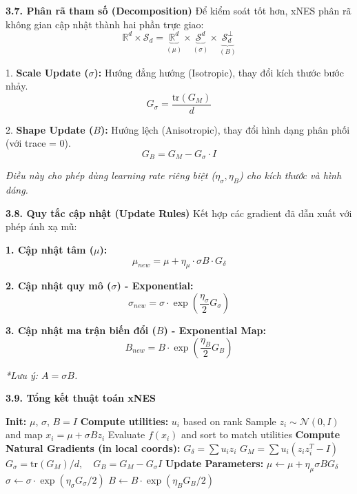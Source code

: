 \documentclass[10pt,xcolor=dvipsnames]{beamer}
\begin{document}
\begin{frame}{\textbf{3.7. Phân rã tham số (Decomposition)}}
	Để kiểm soát tốt hơn, xNES phân rã không gian cập nhật thành hai phần trực giao:
	\[ \mathbb{R}^d \times \mathcal{S}_d = \underbrace{\mathbb{R}^d}_{(\mu)} \times \underbrace{\mathcal{S}^d}_{(\sigma)} \times \underbrace{\mathcal{S}_d^\perp}_{(B)} \]
	
	1. \textbf{Scale Update ($\sigma$):} Hướng đẳng hướng (Isotropic), thay đổi kích thước bước nhảy.
	\[ G_\sigma = \frac{\text{tr}(G_M)}{d} \]
	
	2. \textbf{Shape Update ($B$):} Hướng lệch (Anisotropic), thay đổi hình dạng phân phối (với trace = 0).
	\[ G_B = G_M - G_\sigma \cdot I \]
	
	\textit{Điều này cho phép dùng learning rate riêng biệt ($\eta_\sigma, \eta_B$) cho kích thước và hình dáng.}
\end{frame}

\begin{frame}{\textbf{3.8. Quy tắc cập nhật (Update Rules)}}
	Kết hợp các gradient đã dẫn xuất với phép ánh xạ mũ:
	
	\textbf{1. Cập nhật tâm ($\mu$):}
	\[ \mu_{new} = \mu + \eta_\mu \cdot \sigma B \cdot G_\delta \]
	
	\textbf{2. Cập nhật quy mô ($\sigma$) - Exponential:}
	\[ \sigma_{new} = \sigma \cdot \exp\left( \frac{\eta_\sigma}{2} G_\sigma \right) \]
	
	\textbf{3. Cập nhật ma trận biến đổi ($B$) - Exponential Map:}
	\[ B_{new} = B \cdot \exp\left( \frac{\eta_B}{2} G_B \right) \]
	
	\footnotesize \textit{*Lưu ý: $A = \sigma B$.}
\end{frame}

\begin{frame}{\textbf{3.9. Tổng kết thuật toán xNES}}
	\begin{algorithm}[H]
		\small
		\begin{algorithmic}[1]
			\STATE \textbf{Init:} $\mu$, $\sigma$, $B=I$
			\STATE \textbf{Compute utilities:} $u_i$ based on rank
			\LOOP
			\STATE Sample $z_i \sim \mathcal{N}(0, I)$ and map $x_i = \mu + \sigma B z_i$
			\STATE Evaluate $f(x_i)$ and sort to match utilities
			\STATE \textbf{Compute Natural Gradients (in local coords):}
			\STATE \quad $G_\delta = \sum u_i z_i$
			\STATE \quad $G_M = \sum u_i (z_i z_i^T - I)$
			\STATE \quad $G_\sigma = \text{tr}(G_M)/d, \quad G_B = G_M - G_\sigma I$
			\STATE \textbf{Update Parameters:}
			\STATE \quad $\mu \leftarrow \mu + \eta_\mu \sigma B G_\delta$
			\STATE \quad $\sigma \leftarrow \sigma \cdot \exp(\eta_\sigma G_\sigma / 2)$
			\STATE \quad $B \leftarrow B \cdot \exp(\eta_B G_B / 2)$
			\ENDLOOP
		\end{algorithmic}
	\end{algorithm}
\end{frame}
\end{document}
